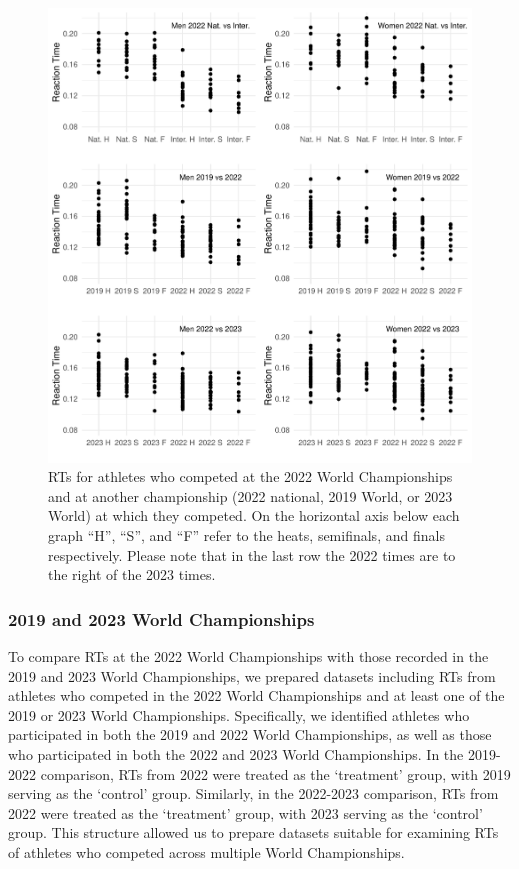 \documentclass[12pt, letterpaper]{article}
\begin{document}
\begin{figure}[tbp]
  \centering
  \includegraphics[width=\textwidth]{RankScatterPlots}
  \caption{RTs for athletes who competed at the 2022 World Championships
    and at another championship (2022 national, 2019 World, or 2023
    World) at which they competed. On the horizontal
    axis below each graph ``H'', ``S'', and ``F'' refer to the heats,
    semifinals, and  finals respectively. Please note that in the last
    row the 2022 times are to the right of the 2023 times.}
  \label{fig:RankScatterplots}
\end{figure}

\subsubsection{2019 and 2023 World Championships}
\label{sec:data2019}

To compare RTs at the 2022 World Championships with those
recorded in the 2019 and 2023 World Championships, we prepared datasets
including RTs from athletes who competed in the 2022 World
Championships and at least one of the 2019 or 2023 World Championships.
Specifically, we identified athletes who participated in both the 2019
and 2022 World Championships, as well as those who participated in both
the 2022 and 2023 World Championships. In the 2019-2022 comparison,
RTs from 2022 were treated as the `treatment' group, with
2019 serving as the `control' group. Similarly, in the 2022-2023
comparison, RTs from 2022 were treated as the `treatment'
group, with 2023 serving as the `control' group. This structure allowed
us to prepare datasets suitable for examining RTs of athletes
who competed across multiple World Championships.
\end{document}
